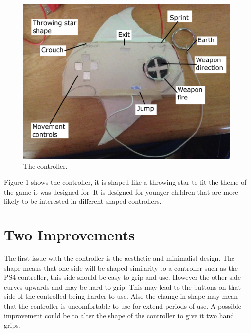 \documentclass{scrartcl}
\begin{document}
\begin{figure}[h]
	\includegraphics[width=1.0\linewidth]{Controller.jpg}
	\caption{ The controller.}
\end{figure}
Figure 1 shows the controller, it is shaped like a throwing star to fit the theme of the game it was designed for. It is designed for younger children that are more likely to be interested in different shaped controllers.

\section{Two Improvements}

The first issue with the controller is the aesthetic and minimalist design. The shape means that one side will be shaped similarity to a controller such as the PS4 controller, this side should be easy to grip and use. However the other side curves upwards and may be hard to grip. This may lead to the buttons on that side of the controlled being harder to use. Also the change in shape may mean that the controller is uncomfortable to use for extend periods of use. A possible improvement could be to alter the shape of the controller to give it two hand grips.
\end{document}
